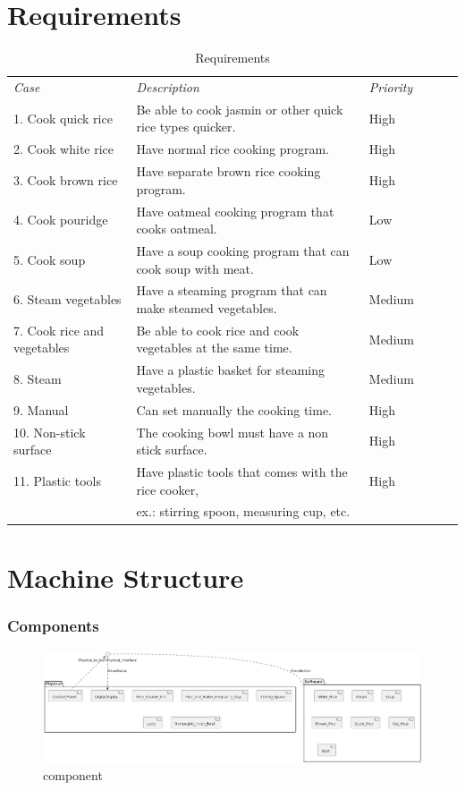 \documentclass{scrartcl}
\begin{document}
\newpage

\section{Requirements}
\begin{table}[H] \centering
    \caption{Requirements}\label{tab:requirementstable}
    \begin{tabular}{@{}ll@{}ll@{}ll} \hline
        \emph{Case} & \emph{Description} & \emph{Priority}\\
        1. Cook quick rice & Be able to cook jasmin or other quick rice types quicker. & High\\
        2. Cook white rice & Have normal rice cooking program. & High\\
        3. Cook brown rice & Have separate brown rice cooking program. & High\\
        4. Cook pouridge & Have oatmeal cooking program that cooks oatmeal. & Low\\
        5. Cook soup & Have a soup cooking program that can cook soup with meat. & Low\\
        6. Steam vegetables & Have a steaming program that can make steamed vegetables. & Medium\\
        7. Cook rice and vegetables & Be able to cook rice and cook vegetables at the same time. & Medium\\
        8. Steam & Have a plastic basket for steaming vegetables. & Medium\\
        9. Manual & Can set manually the cooking time. & High\\ 
        10. Non-stick surface & The cooking bowl must have a non stick surface. & High\\
        11. Plastic tools & Have plastic tools that comes with the rice cooker, & High\\ & ex.: stirring spoon, measuring cup, etc.
    \end{tabular}
\end{table}

\section{Machine Structure}
\subsubsection{Components}
\begin{figure}[H]\centering
    \includegraphics[width=1.2\columnwidth]{Component.png}
    \caption{component}\label{fig:2}
\end{figure}
\end{document}

